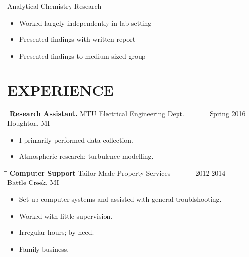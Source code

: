 \documentclass[letterpaper]{res}
\begin{document}
\begin{resume}
        Analytical Chemistry Research
        \begin{itemize} \itemsep1pt \parskip0pt 
                \item Worked largely independently in lab setting
                \item Presented findings with written report
                \item Presented findings to medium-sized group
        \end{itemize}

\section{EXPERIENCE}
   \vspace{-0.15in}
   \begin{tabbing}
   \hspace{2.3in}\= \hspace{2.6in}\= \kill %
   {\bf Research Assistant.} \>MTU Electrical Engineering Dept. \> ~~~~~~ Spring 2016\\
                          \>Houghton, MI
   \end{tabbing}\vspace{-10pt}
   \begin{itemize} \itemsep1pt \parskip0pt 
   \item I primarily performed data collection.
   \item Atmospheric research; turbulence modelling.
   \end{itemize}

   \vspace{-0.15in}
   \begin{tabbing}
   \hspace{2.3in}\= \hspace{2.6in}\= \kill %
    {\bf Computer Support} \>Tailor Made Property Services \> ~~~~~~ 2012-2014\\
                          \>Battle Creek, MI
   \end{tabbing}\vspace{-10pt}
   \begin{itemize} \itemsep1pt \parskip0pt 
   \item Set up computer systems and assisted with general troublshooting.
   \item Worked with little supervision.
   \item Irregular hours; by need.
   \item Family business.
   \end{itemize}


\end{resume}
\end{document}
